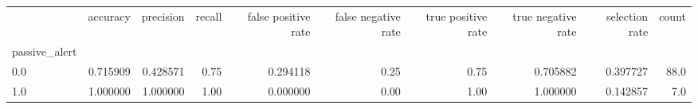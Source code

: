 \begin{tabular}{lrrrrrrrrr}
\toprule
{} &  accuracy &  precision &  recall &  false positive rate &  false negative rate &  true positive rate &  true negative rate &  selection rate &  count \\
passive\_alert &           &            &         &                      &                      &                     &                     &                 &        \\
\midrule
0.0           &  0.715909 &   0.428571 &    0.75 &             0.294118 &                 0.25 &                0.75 &            0.705882 &        0.397727 &   88.0 \\
1.0           &  1.000000 &   1.000000 &    1.00 &             0.000000 &                 0.00 &                1.00 &            1.000000 &        0.142857 &    7.0 \\
\bottomrule
\end{tabular}
